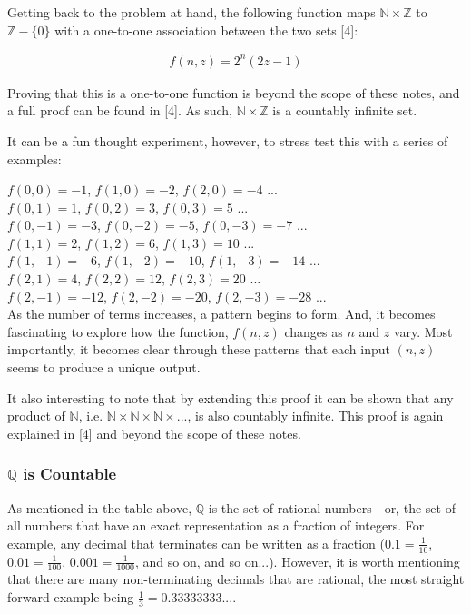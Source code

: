 \documentclass{article}
\begin{document}
Getting back to the problem at hand, the following function maps $\mathbb{N} \times \mathbb{Z}$ to $\mathbb{Z} - \{0\}$ with a one-to-one association between the two sets [4]:

\begin{gather*}
f(n, z) = 2^{n} (2z - 1)
\end{gather*}

Proving that this is a one-to-one function is beyond the scope of these notes, and a full proof can be found in [4]. As such, $\mathbb{N} \times \mathbb{Z}$ is a countably infinite set.

It can be a fun thought experiment, however, to stress test this with a series of examples:

$f(0, 0) = -1$, $f(1, 0) = -2$, $f(2, 0) = -4$ ...\\
$f(0, 1) = 1$, $f(0, 2) = 3$, $f(0, 3) = 5$ ...\\
$f(0, -1) = -3$, $f(0, -2) = -5$, $f(0, -3) = -7$ ...\\
$f(1, 1) = 2$, $f(1, 2) = 6$, $f(1, 3) = 10$ ...\\
$f(1, -1) = -6$, $f(1, -2) = -10$, $f(1, -3) = -14$ ...\\
$f(2, 1) = 4$, $f(2, 2) = 12$, $f(2, 3) = 20$ ...\\
$f(2, -1) = -12$, $f(2, -2) = -20$, $f(2, -3) = -28$ ...\\

As the number of terms increases, a pattern begins to form.  And, it becomes fascinating to explore how the function, $f(n, z)$ changes as $n$ and $z$ vary.  Most importantly, it becomes clear through these patterns that each input $(n, z)$ seems to produce a unique output.

It also interesting to note that by extending this proof it can be shown that any product of $\mathbb{N}$, i.e. $\mathbb{N} \times \mathbb{N} \times \mathbb{N} \times ... $, is also countably infinite.  This proof is again explained in [4] and beyond the scope of these notes.

\subsubsection{$\mathbb{Q}$ is Countable}
As mentioned in the table above, $\mathbb{Q}$ is the set of rational numbers - or, the set of all numbers that have an exact representation as a fraction of integers.  For example, any decimal that terminates can be written as a fraction ($0.1 = \frac{1}{10}$, $0.01 = \frac{1}{100}$, $0.001 = \frac{1}{1000}$, and so on, and so on...).  However, it is worth mentioning that there are many non-terminating decimals that are rational, the most straight forward example being $\frac{1}{3} = 0.33333333...$.
\end{document}
